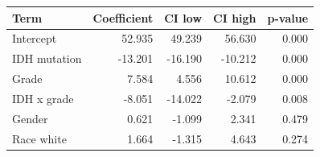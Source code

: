 \begin{tabular}{lrrrr}
\toprule
\textbf{Term} & \textbf{Coefficient} & \textbf{CI low} & \textbf{CI high} & \textbf{p-value} \\
\midrule
Intercept & 52.935 & 49.239 & 56.630 & 0.000 \\
IDH mutation & -13.201 & -16.190 & -10.212 & 0.000 \\
Grade & 7.584 & 4.556 & 10.612 & 0.000 \\
IDH x grade & -8.051 & -14.022 & -2.079 & 0.008 \\
Gender & 0.621 & -1.099 & 2.341 & 0.479 \\
Race white & 1.664 & -1.315 & 4.643 & 0.274 \\
\bottomrule
\end{tabular}
